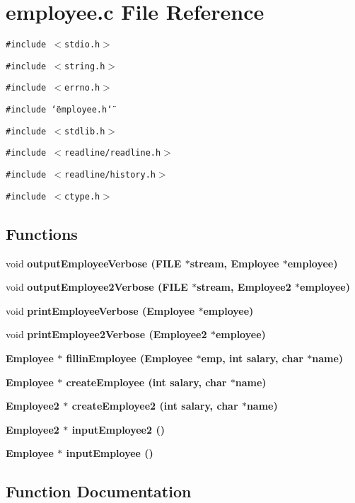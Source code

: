 \section{employee.c File Reference}
\label{employee_8c}
{\tt \#include $<$stdio.h$>$}\par
{\tt \#include $<$string.h$>$}\par
{\tt \#include $<$errno.h$>$}\par
{\tt \#include \char`\"{}employee.h\char`\"{}}\par
{\tt \#include $<$stdlib.h$>$}\par
{\tt \#include $<$readline/readline.h$>$}\par
{\tt \#include $<$readline/history.h$>$}\par
{\tt \#include $<$ctype.h$>$}\par
\subsection*{Functions}
\begin{CompactItemize}
\item 
void \bf{output\-Employee\-Verbose} (FILE $\ast$stream, \bf{Employee} $\ast$employee)
\item 
void \bf{output\-Employee2Verbose} (FILE $\ast$stream, \bf{Employee2} $\ast$employee)
\item 
void \bf{print\-Employee\-Verbose} (\bf{Employee} $\ast$employee)
\item 
void \bf{print\-Employee2Verbose} (\bf{Employee2} $\ast$employee)
\item 
\bf{Employee} $\ast$ \bf{fillin\-Employee} (\bf{Employee} $\ast$emp, int salary, char $\ast$name)
\item 
\bf{Employee} $\ast$ \bf{create\-Employee} (int salary, char $\ast$name)
\item 
\bf{Employee2} $\ast$ \bf{create\-Employee2} (int salary, char $\ast$name)
\item 
\bf{Employee2} $\ast$ \bf{input\-Employee2} ()
\item 
\bf{Employee} $\ast$ \bf{input\-Employee} ()
\end{CompactItemize}


\subsection{Function Documentation}
